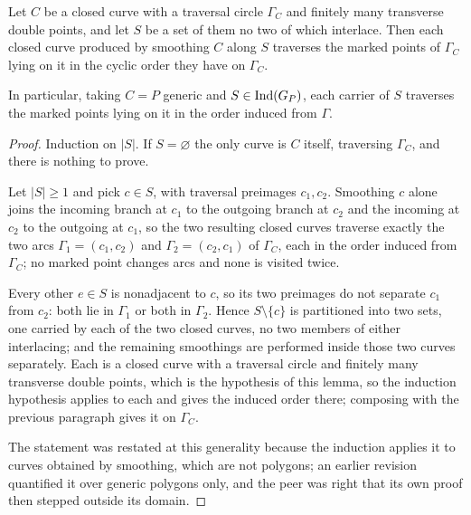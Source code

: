 \begin{lemma}\label{lem:carrierword}
Let $C$ be a closed curve with a traversal circle $\Gamma_C$ and finitely many
transverse double points, and let $S$ be a set of them no two of which
interlace. Then each closed curve produced by smoothing $C$ along $S$ traverses
the marked points of $\Gamma_C$ lying on it in the cyclic order they have on
$\Gamma_C$.

In particular, taking $C=P$ generic and $S\in\operatorname{Ind}(G_P)$, each carrier of $S$
traverses the marked points lying on it in the order induced from $\Gamma$.
\end{lemma}
\begin{proof}
Induction on $|S|$. If $S=\varnothing$ the only curve is $C$ itself, traversing
$\Gamma_C$, and there is nothing to prove.

Let $|S|\geq1$ and pick $c\in S$, with traversal preimages $c_1,c_2$. Smoothing
$c$ alone joins the incoming branch at $c_1$ to the outgoing branch at $c_2$ and
the incoming at $c_2$ to the outgoing at $c_1$, so the two resulting closed
curves traverse exactly the two arcs $\Gamma_1=(c_1,c_2)$ and
$\Gamma_2=(c_2,c_1)$ of $\Gamma_C$, each in the order induced from $\Gamma_C$;
no marked point changes arcs and none is visited twice.

Every other $e\in S$ is nonadjacent to $c$, so its two preimages do not separate
$c_1$ from $c_2$: both lie in $\Gamma_1$ or both in $\Gamma_2$. Hence
$S\setminus\{c\}$ is partitioned into two sets, one carried by each of the two
closed curves, no two members of either interlacing; and the remaining
smoothings are performed inside those two curves separately. Each is a closed
curve with a traversal circle and finitely many transverse double points, which
is the hypothesis of this lemma, so the induction hypothesis applies to each and
gives the induced order there; composing with the previous paragraph gives it on
$\Gamma_C$.

The statement was restated at this generality because the induction applies it
to curves obtained by smoothing, which are not polygons; an earlier revision
quantified it over generic polygons only, and the peer was right that its own
proof then stepped outside its domain.
\end{proof}

